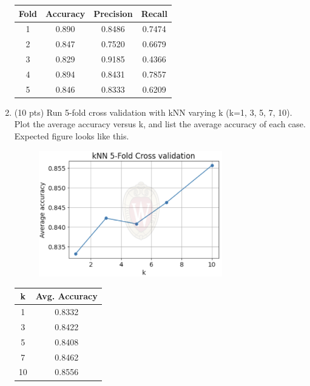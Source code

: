 \documentclass[a4paper]{article}
\theoremstyle{definition}
\newenvironment{soln}{
    \leavevmode\color{blue}\ignorespaces
}{}
\begin{document}
\begin{enumerate}
	\begin{soln}
		\begin{center}
			\begin{tabular}{|c|c|c|c|}
				\hline
				Fold & Accuracy & Precision & Recall \\
				\hline
				1  &  0.890  &  0.8486  &  0.7474  \\
				2  &  0.847  &  0.7520  &  0.6679  \\
				3  &  0.829  &  0.9185  &  0.4366  \\
				4  &  0.894  &  0.8431  &  0.7857  \\
				5  &  0.846  &  0.8333  &  0.6209  \\
				\hline
			\end{tabular}
		\end{center}
	\end{soln}
	
	\item (10 pts) Run 5-fold cross validation with kNN varying k (k=1, 3, 5, 7, 10). Plot the average accuracy versus k, and list the average accuracy of each case. \\
	Expected figure looks like this.
	\begin{figure}[h]
		\centering
		\includegraphics[width=8cm]{../figs/knn.png}
	\end{figure}
	
	\begin{soln}
		\begin{center}
			\begin{tabular}{|c|c|}
				\hline
				k & Avg. Accuracy \\
				\hline
				1 & 0.8332 \\
				3 & 0.8422 \\
				5 & 0.8408 \\
				7 & 0.8462 \\
				10 & 0.8556 \\
				\hline
			\end{tabular}
		\end{center}
		

\end{soln}
\end{enumerate}
\end{document}

